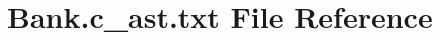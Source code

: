 \hypertarget{Bank_8c__ast_8txt}{}\section{Bank.\+c\+\_\+ast.\+txt File Reference}
\label{Bank_8c__ast_8txt}
